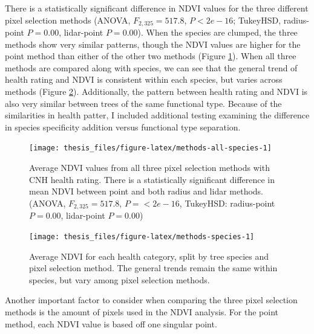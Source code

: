 \documentclass[12pt,twoside]{reedthesis}
\begin{document}
There is a statistically significant difference in NDVI values for the three different pixel selection methods (ANOVA, \(F_{2, 325}=517.8\), \(P < 2e-16\); TukeyHSD, radius-point \(P = 0.00\), lidar-point \(P = 0.00\)). When the species are clumped, the three methods show very similar patterns, though the NDVI values are higher for the point method than either of the other two methods (Figure \ref{fig:methods-all-species}). When all three methods are compared along with species, we can see that the general trend of health rating and NDVI is consistent within each species, but varies across methods (Figure \ref{fig:methods-species}). Additionally, the pattern between health rating and NDVI is also very similar between trees of the same functional type. Because of the similarities in health patter, I included additional testing examining the difference in species specificity addition versus functional type separation.
\begin{figure}
\texttt{[image: thesis\_files/figure-latex/methods-all-species-1]} \caption[NDVI and health rating comparison across methods]{Average NDVI values from all three pixel selection methods with CNH health rating. There is a statistically significant difference in mean NDVI between point and both radius and lidar methods. (ANOVA, $F_{2, 325}=517.8$, $P = <2e-16$, TukeyHSD: radius-point $P = 0.00$, lidar-point $P = 0.00$)}\label{fig:methods-all-species}
\end{figure}
\begin{figure}
\texttt{[image: thesis\_files/figure-latex/methods-species-1]} \caption[Average NDVI comparison between species and methods.]{Average NDVI for each health category, split by tree species and pixel selection method. The general trends remain the same within species, but vary among pixel selection methods.}\label{fig:methods-species}
\end{figure}
Another important factor to consider when comparing the three pixel selection methods is the amount of pixels used in the NDVI analysis. For the point method, each NDVI value is based off one singular point.
\end{document}
